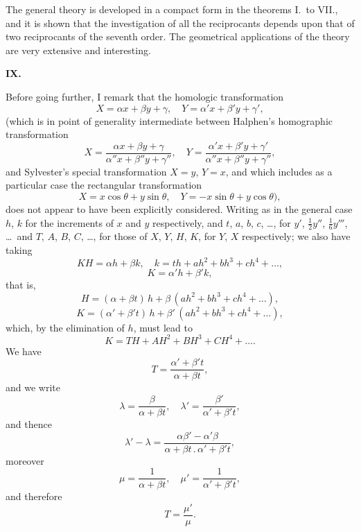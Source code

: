 \documentclass[11pt]{article}
\begin{document}
The general theory is developed in a compact form in the theorems I.\ to VII., and it is shown that the investigation of all the reciprocants depends upon that of two reciprocants of the seventh order. The geometrical applications of the theory are very extensive and interesting.

\medskip
\begin{center}\textbf{IX.}\end{center}

Before going further, I remark that the homologic transformation
\[
X = \alpha x + \beta y + \gamma,\quad Y = \alpha' x + \beta' y + \gamma',
\]
(which is in point of generality intermediate between Halphen's homographic transformation
\[
X = \frac{\alpha x + \beta y + \gamma}{\alpha'' x + \beta'' y + \gamma''},\quad Y = \frac{\alpha' x + \beta' y + \gamma'}{\alpha'' x + \beta'' y + \gamma''},
\]
and Sylvester's special transformation $X = y$, $Y = x$, and which includes as a particular case the rectangular transformation
\[
X = x\cos\theta + y\sin\theta,\quad Y = -x\sin\theta + y\cos\theta),
\]
does not appear to have been explicitly considered. Writing as in the general case $h$, $k$ for the increments of $x$ and $y$ respectively, and $t$, $a$, $b$, $c$, \ldots, for $y'$, $\tfrac{1}{2} y''$, $\tfrac{1}{6} y'''$, \ldots\ and $T$, $A$, $B$, $C$, \ldots, for those of $X$, $Y$, $H$, $K$, for $Y$, $X$ respectively; we also have taking
\[
K H = \alpha h + \beta k,\quad k = t h + a h^2 + b h^3 + c h^4 + \ldots,
\]
\[
K = \alpha' h + \beta' k,
\]
that is,
\[
H = (\alpha + \beta t)\,h + \beta\,(a h^2 + b h^3 + c h^4 + \ldots),
\]
\[
K = (\alpha' + \beta' t)\,h + \beta'\,(a h^2 + b h^3 + c h^4 + \ldots),
\]
which, by the elimination of $h$, must lead to
\[
K = T H + A H^2 + B H^3 + C H^4 + \ldots.
\]
We have
\[
T = \frac{\alpha' + \beta' t}{\alpha + \beta t},
\]
and we write
\[
\lambda = \frac{\beta}{\alpha + \beta t},\quad \lambda' = \frac{\beta'}{\alpha' + \beta' t},
\]
and thence
\[
\lambda' - \lambda = \frac{\alpha\beta' - \alpha'\beta}{\alpha + \beta t\,.\,\alpha' + \beta' t},
\]
moreover
\[
\mu = \frac{1}{\alpha + \beta t},\quad \mu' = \frac{1}{\alpha' + \beta' t},
\]
and therefore
\[
T = \frac{\mu'}{\mu}.
\]
\end{document}
